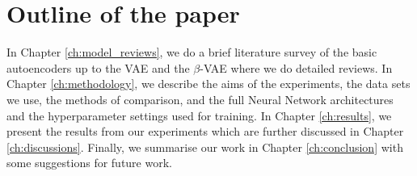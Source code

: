     \section{Outline of the paper}
        In Chapter \ref{ch:model_reviews}, we do a brief literature survey of the basic autoencoders up to the VAE and the $\beta$-VAE where we do detailed reviews. In Chapter \ref{ch:methodology}, we describe the aims of the experiments, the data sets we use, the methods of comparison, and the full Neural Network architectures and the hyperparameter settings used for training. In Chapter \ref{ch:results}, we present the results from our experiments which are further discussed in Chapter \ref{ch:discussions}. Finally, we summarise our work in Chapter \ref{ch:conclusion} with some suggestions for future work.